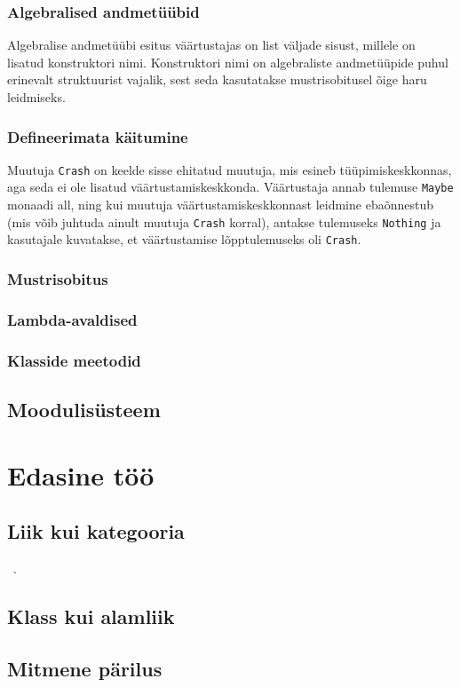 \documentclass[12pt]{article}
\newcommand\peatykk[1]{
  \clearpage
  \section{#1}}
\begin{document}
      \subsubsection{Algebralised andmetüübid}
        Algebralise andmetüübi esitus väärtustajas on list väljade sisust, millele on lisatud konstruktori nimi. Konstruktori nimi on algebraliste andmetüüpide puhul erinevalt struktuurist vajalik, sest seda kasutatakse mustrisobitusel õige haru leidmiseks.
      \subsubsection{Defineerimata käitumine}
        Muutuja \verb!Crash! on keelde sisse ehitatud muutuja, mis esineb tüüpimiskeskkonnas, aga seda ei ole lisatud väärtustamiskeskkonda. Väärtustaja annab tulemuse \verb!Maybe! monaadi all, ning kui muutuja väärtustamiskeskkonnast leidmine ebaõnnestub (mis võib juhtuda ainult muutuja \verb!Crash! korral), antakse tulemuseks \verb!Nothing! ja kasutajale kuvatakse, et väärtustamise lõpptulemuseks oli \verb!Crash!.
      \subsubsection{Mustrisobitus}
        
      \subsubsection{Lambda-avaldised}
        
      \subsubsection{Klasside meetodid}
        
    \subsection{Moodulisüsteem}
      
  \peatykk{Edasine töö}
    \subsection{Liik kui kategooria}
      ~\cite{Cat}.
    \subsection{Klass kui alamliik}
      
    \subsection{Mitmene pärilus}
      
\end{document}
